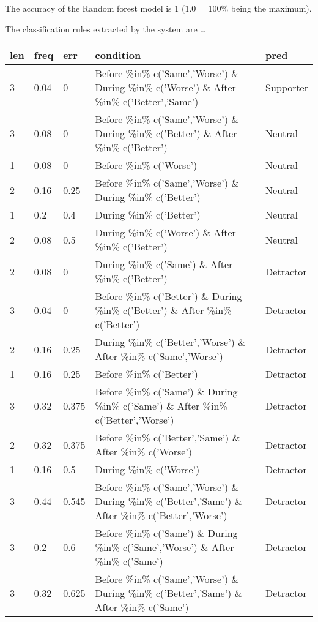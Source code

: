 \documentclass[
]{article}
\begin{document}
The accuracy of the Random forest model is 1 (1.0 = 100\% being the
maximum).

The classification rules extracted by the system are \ldots{}

\begin{table}[H]
\centering
\begin{tabular}{l|l|l|l|l}
\hline
len & freq & err & condition & pred\\
\hline
3 & 0.04 & 0 & Before \%in\% c('Same','Worse') \& During \%in\% c('Worse') \& After \%in\% c('Better','Same') & Supporter\\
\hline
3 & 0.08 & 0 & Before \%in\% c('Same','Worse') \& During \%in\% c('Better') \& After \%in\% c('Better') & Neutral\\
\hline
1 & 0.08 & 0 & Before \%in\% c('Worse') & Neutral\\
\hline
2 & 0.16 & 0.25 & Before \%in\% c('Same','Worse') \& During \%in\% c('Better') & Neutral\\
\hline
1 & 0.2 & 0.4 & During \%in\% c('Better') & Neutral\\
\hline
2 & 0.08 & 0.5 & During \%in\% c('Worse') \& After \%in\% c('Better') & Neutral\\
\hline
2 & 0.08 & 0 & During \%in\% c('Same') \& After \%in\% c('Better') & Detractor\\
\hline
3 & 0.04 & 0 & Before \%in\% c('Better') \& During \%in\% c('Better') \& After \%in\% c('Better') & Detractor\\
\hline
2 & 0.16 & 0.25 & During \%in\% c('Better','Worse') \& After \%in\% c('Same','Worse') & Detractor\\
\hline
1 & 0.16 & 0.25 & Before \%in\% c('Better') & Detractor\\
\hline
3 & 0.32 & 0.375 & Before \%in\% c('Same') \& During \%in\% c('Same') \& After \%in\% c('Better','Worse') & Detractor\\
\hline
2 & 0.32 & 0.375 & Before \%in\% c('Better','Same') \& After \%in\% c('Worse') & Detractor\\
\hline
1 & 0.16 & 0.5 & During \%in\% c('Worse') & Detractor\\
\hline
3 & 0.44 & 0.545 & Before \%in\% c('Same','Worse') \& During \%in\% c('Better','Same') \& After \%in\% c('Better','Worse') & Detractor\\
\hline
3 & 0.2 & 0.6 & Before \%in\% c('Same') \& During \%in\% c('Same','Worse') \& After \%in\% c('Same') & Detractor\\
\hline
3 & 0.32 & 0.625 & Before \%in\% c('Same','Worse') \& During \%in\% c('Better','Same') \& After \%in\% c('Same') & Detractor\\
\hline
\end{tabular}
\end{table}
\end{document}
